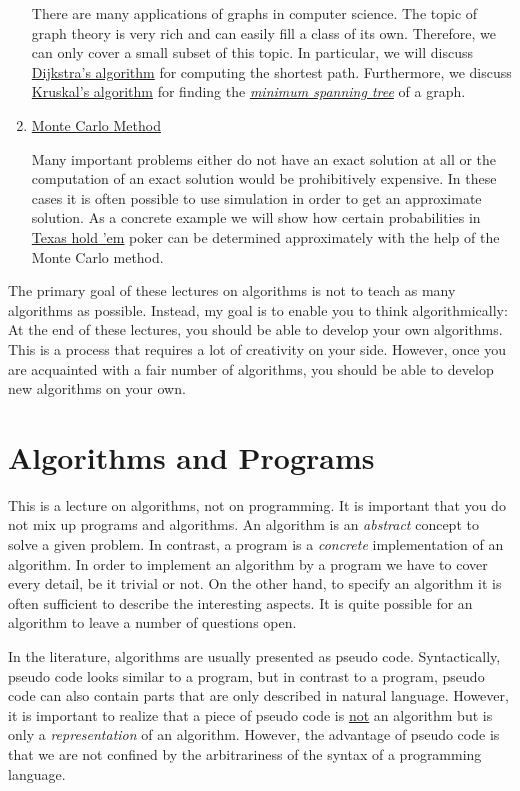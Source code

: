 \begin{enumerate}
      There are many applications of graphs in computer science.  The topic of graph theory is very
      rich and can easily fill a class of its own.  Therefore, we can only cover a small subset of this topic.
      In particular, we will discuss
      \href{http://en.wikipedia.org/wiki/Dijkstra%27s_algorithm}{Dijkstra's algorithm}
      for computing the shortest path.
      Furthermore, we discuss 
      \href{https://en.wikipedia.org/wiki/Kruskal%27s_algorithm}{Kruskal's algorithm} for finding the
      \href{https://en.wikipedia.org/wiki/Minimum_spanning_tree}{\emph{minimum spanning tree}} of a graph.
\item \href{http://en.wikipedia.org/wiki/Monte_Carlo_method}{Monte Carlo Method} 
 
      Many important problems either do not have an exact solution at all or the computation of an
      exact solution would be prohibitively expensive.  In these cases it is often possible to use 
      simulation in order to get an approximate solution.  As a concrete example we will show
      how certain probabilities in \href{http://en.wikipedia.org/wiki/Texas_hold_%27em}{Texas hold 'em} 
      poker can be determined approximately with the help of the Monte
      Carlo method.
\end{enumerate}
The primary goal of these lectures on algorithms is not to teach as many algorithms as possible.
Instead, my goal is to enable you to think algorithmically:  At the end of these
lectures, you should be able to develop your own algorithms.  This is a process that
requires a lot of creativity on your side.
However, once you are acquainted with a fair number of algorithms, you should be able to develop
new algorithms on your own.

\section{Algorithms and Programs}
This is a lecture on algorithms, not on programming.  It is important that you do not mix up
programs and algorithms.  An algorithm is an \emph{abstract} concept to solve a given problem.  In
contrast, a program is a \emph{concrete} implementation of an algorithm.  In order to implement an
algorithm by a program we have to cover every detail, be it trivial or not.  On the other hand, 
to specify an algorithm it is often sufficient to describe the interesting aspects.  It is
quite possible for an algorithm to leave a number of questions open.

In the literature, algorithms are usually presented as pseudo code.  Syntactically, pseudo code looks
similar to a program, but in contrast to a program, pseudo code can also contain parts that are only
described in natural language.   However, it is important to realize that a piece of pseudo code is
\underline{not} an algorithm but is only a \emph{ representation} of an algorithm.  However, the
advantage of pseudo code is that we are not confined by the arbitrariness of the syntax of a
programming language.


